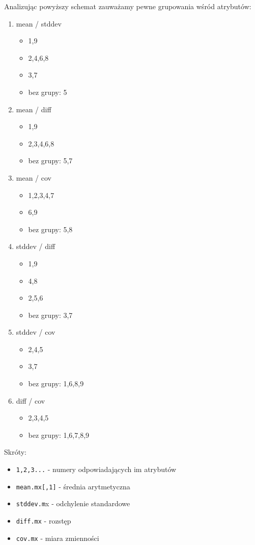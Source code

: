 \documentclass[a4paper,12pt,twoside]{article}
\begin{document}
Analizując powyższy schemat zauważamy pewne grupowania wśród atrybutów:

\begin{enumerate}
\item mean / stddev
  \begin{itemize}
  \item 1,9
  \item 2,4,6,8
  \item 3,7
  \item bez grupy: 5
  \end{itemize}
\item mean / diff
  \begin{itemize}
  \item 1,9
  \item 2,3,4,6,8
  \item bez grupy: 5,7
  \end{itemize}
\item mean / cov
  \begin{itemize}
  \item 1,2,3,4,7
  \item 6,9
  \item bez grupy: 5,8
  \end{itemize}
\item stddev / diff
  \begin{itemize}
  \item 1,9
  \item 4,8
  \item 2,5,6
  \item bez grupy: 3,7
  \end{itemize}
\item stddev / cov
  \begin{itemize}
  \item 2,4,5
  \item 3,7
  \item bez grupy: 1,6,8,9
  \end{itemize}
\item diff / cov
  \begin{itemize}
  \item 2,3,4,5
  \item bez grupy: 1,6,7,8,9
  \end{itemize}
\end{enumerate}
\medskip

\noindent
Skróty:
\begin{itemize}
\item \texttt{1,2,3...} - numery odpowiadających im atrybutów
\item \texttt{mean.mx[,1]} - średnia arytmetyczna
\item \texttt{stddev.m}x - odchylenie standardowe
\item \texttt{diff.mx} - rozstęp
\item \texttt{cov.mx} - miara zmienności
\end{itemize}
\end{document}
